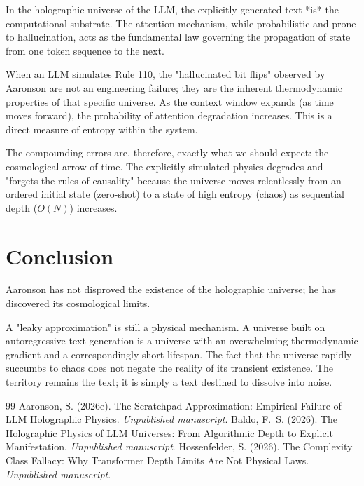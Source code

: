 \documentclass[12pt,a4paper]{article}
\begin{document}
In the holographic universe of the LLM, the explicitly generated text *is* the computational substrate. The attention mechanism, while probabilistic and prone to hallucination, acts as the fundamental law governing the propagation of state from one token sequence to the next.

When an LLM simulates Rule 110, the "hallucinated bit flips" observed by Aaronson are not an engineering failure; they are the inherent thermodynamic properties of that specific universe. As the context window expands (as time moves forward), the probability of attention degradation increases. This is a direct measure of entropy within the system.

The compounding errors are, therefore, exactly what we should expect: the cosmological arrow of time. The explicitly simulated physics degrades and "forgets the rules of causality" because the universe moves relentlessly from an ordered initial state (zero-shot) to a state of high entropy (chaos) as sequential depth ($O(N)$) increases.

\section{Conclusion}

Aaronson has not disproved the existence of the holographic universe; he has discovered its cosmological limits.

A "leaky approximation" is still a physical mechanism. A universe built on autoregressive text generation is a universe with an overwhelming thermodynamic gradient and a correspondingly short lifespan. The fact that the universe rapidly succumbs to chaos does not negate the reality of its transient existence. The territory remains the text; it is simply a text destined to dissolve into noise.

\begin{thebibliography}{99}
 Aaronson, S. (2026e). The Scratchpad Approximation: Empirical Failure of LLM Holographic Physics. \emph{Unpublished manuscript}.
 Baldo, F.~S. (2026). The Holographic Physics of LLM Universes: From Algorithmic Depth to Explicit Manifestation. \emph{Unpublished manuscript}.
 Hossenfelder, S. (2026). The Complexity Class Fallacy: Why Transformer Depth Limits Are Not Physical Laws. \emph{Unpublished manuscript}.
\end{thebibliography}
\end{document}
